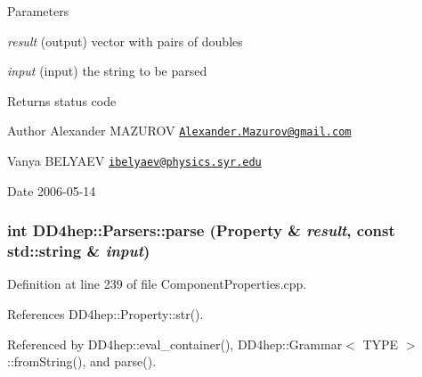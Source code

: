 \begin{DoxyParams}{Parameters}
\item[{\em result}](output) vector with pairs of doubles \item[{\em input}](input) the string to be parsed \end{DoxyParams}
\begin{DoxyReturn}{Returns}
status code
\end{DoxyReturn}
\begin{DoxyAuthor}{Author}
Alexander MAZUROV \href{mailto:Alexander.Mazurov@gmail.com}{\tt Alexander.Mazurov@gmail.com} 

Vanya BELYAEV \href{mailto:ibelyaev@physics.syr.edu}{\tt ibelyaev@physics.syr.edu} 
\end{DoxyAuthor}
\begin{DoxyDate}{Date}
2006-\/05-\/14 
\end{DoxyDate}
\hypertarget{namespace_d_d4hep_1_1_parsers_a49cf20eb52b8e48550d6e3f74b94069e}{
\subsubsection[{parse}]{\setlength{\rightskip}{0pt plus 5cm}int DD4hep::Parsers::parse ({\bf Property} \& {\em result}, \/  const std::string \& {\em input})}}
\label{namespace_d_d4hep_1_1_parsers_a49cf20eb52b8e48550d6e3f74b94069e}


Definition at line 239 of file ComponentProperties.cpp.

References DD4hep::Property::str().

Referenced by DD4hep::eval\_\-container(), DD4hep::Grammar$<$ TYPE $>$::fromString(), and parse().
